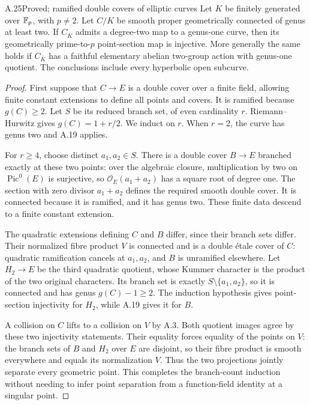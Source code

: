 \begin{claim}{A.25}{Proved; ramified double covers of elliptic curves}
Let $K$ be finitely generated over $\mathbb F_p$, with $p\ne2$.
Let $C/K$ be smooth proper geometrically connected of genus
at least two. If $C_{\overline K}$ admits a degree-two map
to a genus-one curve, then its geometrically prime-to-$p$
point-section map is injective. More generally the same
holds if $C_{\overline K}$ has a faithful elementary
abelian two-group action with genus-one quotient. The
conclusions include every hyperbolic open subcurve.
\end{claim}
\begin{proof}
First suppose that $C\to E$ is a double cover over a
finite field, allowing finite constant extensions to define
all points and covers. It is ramified because $g(C)\ge2$.
Let $S$ be its reduced branch set, of even cardinality $r$.
Riemann--Hurwitz gives $g(C)=1+r/2$. We induct on $r$.
When $r=2$, the curve has genus two and A.19 applies.

For $r\ge4$, choose distinct $a_1,a_2\in S$. There is a
double cover $B\to E$ branched exactly at these two
points: over the algebraic closure, multiplication by two
on $\operatorname{Pic}^0(E)$ is surjective, so
$\mathcal O_E(a_1+a_2)$ has a square root of degree one.
The section with zero divisor $a_1+a_2$ defines the
required smooth double cover. It is connected because it
is ramified, and it has genus two. These finite data descend
to a finite constant extension.

The quadratic extensions defining $C$ and $B$ differ,
since their branch sets differ. Their normalized fibre
product $V$ is connected and is a double \'etale cover of
$C$: quadratic ramification cancels at $a_1,a_2$, and
$B$ is unramified elsewhere. Let $H_2\to E$ be the third
quadratic quotient, whose Kummer character is the product
of the two original characters. Its branch set is exactly
$S\setminus\{a_1,a_2\}$, so it is connected and has genus
$g(C)-1\ge2$. The induction hypothesis gives point-section
injectivity for $H_2$, while A.19 gives it for $B$.

A collision on $C$ lifts to a collision on $V$ by A.3.
Both quotient images agree by these two injectivity
statements. Their equality forces equality of the points
on $V$: the branch sets of $B$ and $H_2$ over $E$ are
disjoint, so their fibre product is smooth everywhere and
equals its normalization $V$. Thus the two projections
jointly separate every geometric point. This completes
the branch-count induction without needing to infer point
separation from a function-field identity at a singular
point.


\end{proof}
